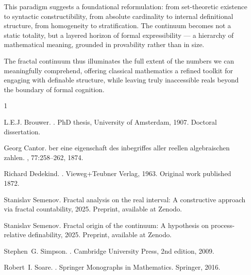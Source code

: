 \documentclass[12pt]{article}
\theoremstyle{definition}
\theoremstyle{plain}
\theoremstyle{remark}
\begin{document}
This paradigm suggests a foundational reformulation: from set-theoretic existence to syntactic constructibility, from absolute cardinality to internal definitional structure, from homogeneity to stratification. The continuum becomes not a static totality, but a layered horizon of formal expressibility — a hierarchy of mathematical meaning, grounded in provability rather than in size.

The fractal continuum thus illuminates the full extent of the numbers we can meaningfully comprehend, offering classical mathematics a refined toolkit for engaging with definable structure, while leaving truly inaccessible reals beyond the boundary of formal cognition.


% 
% 

\begin{thebibliography}{1}

L.E.J. Brouwer.
.
\newblock PhD thesis, University of Amsterdam, 1907.
\newblock Doctoral dissertation.

Georg Cantor.
ber eine eigenschaft des inbegriffes aller reellen algebraischen zahlen.
, 77:258--262, 1874.

Richard Dedekind.
.
\newblock Vieweg+Teubner Verlag, 1963.
\newblock Original work published 1872.

Stanislav Semenov.
\newblock Fractal analysis on the real interval: A constructive approach via fractal countability, 2025.
\newblock Preprint, available at Zenodo.

Stanislav Semenov.
\newblock Fractal origin of the continuum: A hypothesis on process-relative definability, 2025.
\newblock Preprint, available at Zenodo.

Stephen~G. Simpson.
.
\newblock Cambridge University Press, 2nd edition, 2009.

Robert~I. Soare.
.
\newblock Springer Monographs in Mathematics. Springer, 2016.

\end{thebibliography}
\end{document}
